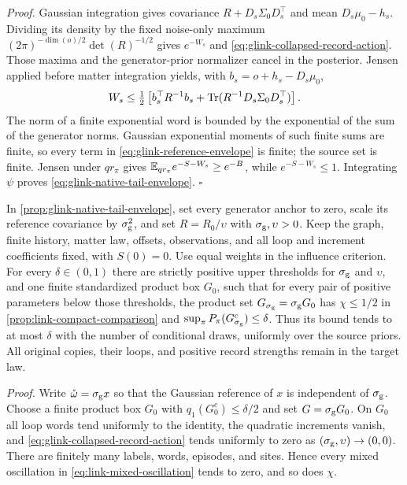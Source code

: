 \noindent\emph{Proof.}
Gaussian integration gives covariance $R+D_s\Sigma_0D_s^\top$ and mean
$D_s\mu_0-h_s$. Dividing its density by the fixed noise-only maximum
$(2\pi)^{-\dim(o)/2}\det(R)^{-1/2}$ gives
$e^{-W_s}$ and \cref{eq:glink-collapsed-record-action}. Those maxima and the
generator-prior normalizer cancel in the posterior. Jensen applied before
matter integration yields, with $b_s=o+h_s-D_s\mu_0$,
\begin{equation}
W_s\le\tfrac12\left[b_s^\top R^{-1}b_s+
\operatorname{Tr}(R^{-1}D_s\Sigma_0D_s^\top)\right].
\end{equation}
The norm of a finite exponential word is bounded by the exponential of the sum
of the generator norms. Gaussian exponential moments of such finite sums are
finite, so every term in \cref{eq:glink-reference-envelope} is finite; the source
set is finite. Jensen under $q r_\pi$ gives
$\mathbb E_{q r_\pi}e^{-S-W_s}\ge e^{-B}$, while $e^{-S-W_s}\le1$.
Integrating $\psi$ proves \cref{eq:glink-native-tail-envelope}. $\square$

In \cref{prop:glink-native-tail-envelope}, set every generator anchor to zero,
scale its reference covariance by $\sigma_{\rm g}^2$, and set
$R=R_0/\upsilon$ with $\sigma_{\rm g},\upsilon>0$. Keep the graph, finite history,
matter law, offsets, observations, and all loop and increment coefficients fixed,
with $S(0)=0$. Use equal weights in the influence criterion.
For every $\delta\in(0,1)$ there are strictly positive upper thresholds for
$\sigma_{\rm g}$ and $\upsilon$, and one finite standardized product box $G_0$,
such that for every pair of positive parameters below those thresholds,
the product set $G_{\sigma_{\rm g}}=\sigma_{\rm g}G_0$ has
$\chi\le1/2$ in \cref{prop:link-compact-comparison} and
$\sup_\pi P_\pi(G_{\sigma_{\rm g}}^c)\le\delta$. Thus its bound tends to at most $\delta$ with
the number of conditional draws, uniformly over the source priors. All original
copies, their loops, and positive record strengths remain in the target law.

\noindent\emph{Proof.}
Write $\mathring\omega=\sigma_{\rm g}x$ so that the Gaussian reference of $x$
is independent of $\sigma_{\rm g}$. Choose a finite product box $G_0$ with
$q_1(G_0^c)\le\delta/2$ and set $G=\sigma_{\rm g}G_0$. On $G_0$ all loop
words tend uniformly to the identity, the quadratic increments vanish, and
\cref{eq:glink-collapsed-record-action} tends uniformly to zero as
$(\sigma_{\rm g},\upsilon)\to(0,0)$. There are finitely many labels, words,
episodes, and sites. Hence every mixed oscillation in
\cref{eq:link-mixed-oscillation} tends to zero, and so does $\chi$.

